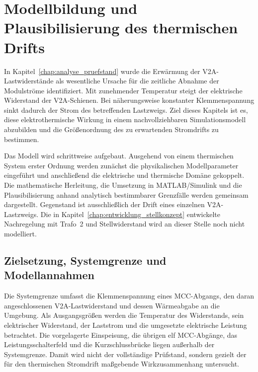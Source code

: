 \section{Modellbildung und Plausibilisierung des thermischen Drifts}
\label{chap:modellbildung_simulation}
\label{chap:modellbildung}

In Kapitel~\ref{chap:analyse_pruefstand} wurde die Erwärmung der
V2A-Lastwiderstände als wesentliche Ursache für die zeitliche Abnahme der
Modulströme identifiziert. Mit zunehmender Temperatur steigt der elektrische
Widerstand der V2A-Schienen. Bei näherungsweise konstanter Klemmenspannung
sinkt dadurch der Strom des betreffenden Lastzweigs. Ziel dieses Kapitels ist
es, diese elektrothermische Wirkung in einem nachvollziehbaren Simulationsmodell
abzubilden und die Größenordnung des zu erwartenden Stromdrifts zu bestimmen.

Das Modell wird schrittweise aufgebaut. Ausgehend von einem thermischen
System erster Ordnung werden zunächst die physikalischen Modellparameter
eingeführt und anschließend die elektrische und thermische Domäne gekoppelt.
Die mathematische Herleitung, die Umsetzung in MATLAB/Simulink und die
Plausibilisierung anhand analytisch bestimmbarer Grenzfälle werden gemeinsam
dargestellt. Gegenstand ist ausschließlich der Drift eines einzelnen
V2A-Lastzweigs. Die in Kapitel~\ref{chap:entwicklung_stellkonzept} entwickelte
Nachregelung mit Trafo~2 und Stellwiderstand wird an dieser Stelle noch nicht
modelliert.


\subsection{Zielsetzung, Systemgrenze und Modellannahmen}
\label{sec:zielsetzung_systemgrenze_modellannahmen}

Die Systemgrenze umfasst die Klemmenspannung eines MCC-Abgangs, den daran
angeschlossenen V2A-Lastwiderstand und dessen Wärmeabgabe an die Umgebung. Als
Ausgangsgrößen werden die Temperatur des Widerstands, sein elektrischer
Widerstand, der Laststrom und die umgesetzte elektrische Leistung betrachtet.
Die vorgelagerte Einspeisung, die übrigen elf MCC-Abgänge, das
Leistungsschalterfeld und die Kurzschlussbrücke liegen außerhalb der
Systemgrenze. Damit wird nicht der vollständige Prüfstand, sondern gezielt der
für den thermischen Stromdrift maßgebende Wirkzusammenhang untersucht.

